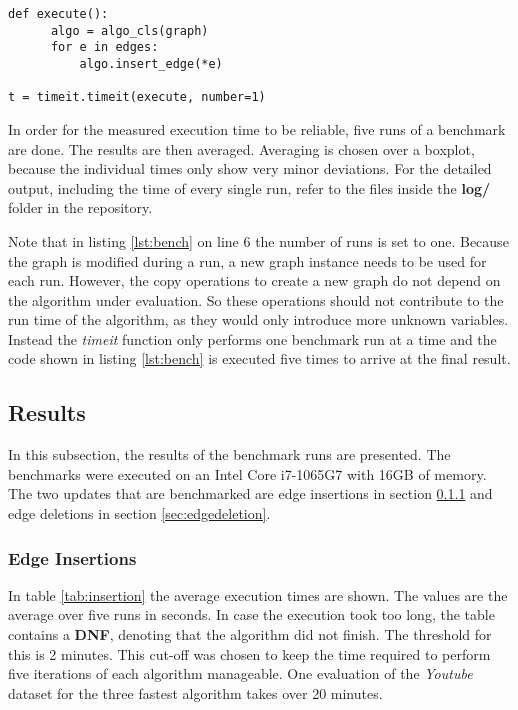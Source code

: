 \documentclass[letterpaper,11pt]{article}
\begin{document}
\begin{lstlisting}[label={lst:bench}, caption=Benchmark Code Snippet]
def execute():
      algo = algo_cls(graph)
      for e in edges:
          algo.insert_edge(*e)

t = timeit.timeit(execute, number=1)
\end{lstlisting}

In order for the measured execution time to be reliable, five runs of a
benchmark are done. The results are then averaged. Averaging is chosen over a
boxplot, because the individual times only show very minor deviations.
For the detailed output, including the time of every single run, refer to the
files inside the \textbf{log/} folder in the repository.

Note that in listing \ref{lst:bench} on line 6 the number of runs is set to
one. Because the graph is modified during a run, a new graph instance needs to
be used for each run. However, the copy operations to create a new graph do not
depend on the algorithm under evaluation. So these operations should not
contribute to the run time of the algorithm, as they would only introduce more
unknown variables. Instead the \textit{timeit} function only performs one
benchmark run at a time and the code shown in listing \ref{lst:bench} is executed
five times to arrive at the final result.

\subsection{Results}

In this subsection, the results of the benchmark runs are presented. The
benchmarks were executed on an Intel Core i7-1065G7 with 16GB of memory. The two
updates that are benchmarked are edge insertions in section
\ref{sec:edgeinsertion} and edge deletions in section \ref{sec:edgedeletion}.


\subsubsection{Edge Insertions}
\label{sec:edgeinsertion}

In table \ref{tab:insertion} the average execution times are shown. The values
are the average over five runs in seconds. In case the execution took too long,
the table contains a \textbf{DNF}, denoting that the algorithm did not finish.
The threshold for this is 2 minutes. This cut-off was chosen to keep the time
required to perform five iterations of each algorithm manageable. One evaluation
of the \textit{Youtube} dataset for the three fastest algorithm takes over 20
minutes.
\end{document}

